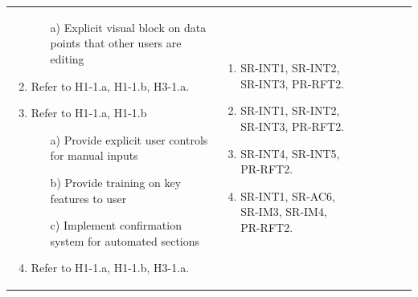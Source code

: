 \documentclass{article}
\begin{document}
\begin{landscape}
\begin{longtable}{|p{2cm}|p{4cm}|p{4cm}|p{4cm}|p{4cm}|p{2cm}|p{2cm}|}
\begin{enumerate}[leftmargin=*]
\begin{enumerate}
        \item[a)] Explicit visual block on data points that other users are editing
    \end{enumerate}
    \item Refer to H1-1.a, H1-1.b, H3-1.a.
    \item Refer to H1-1.a, H1-1.b
    \begin{enumerate}
        \item[a)] Provide explicit user controls for manual inputs
        \item[b)] Provide training on key features to user
        \item[c)] Implement confirmation system for automated sections
    \end{enumerate}
    \item Refer to H1-1.a, H1-1.b, H3-1.a.
  \end{enumerate} &
  \begin{enumerate}[leftmargin=*]
    \item SR-INT1, SR-INT2, SR-INT3, PR-RFT2.
    \item SR-INT1, SR-INT2, SR-INT3, PR-RFT2.
    \item SR-INT4, SR-INT5, PR-RFT2.
    \item SR-INT1, SR-AC6, SR-IM3, SR-IM4, PR-RFT2.


\end{enumerate}
\end{longtable}
\end{landscape}
\end{document}
